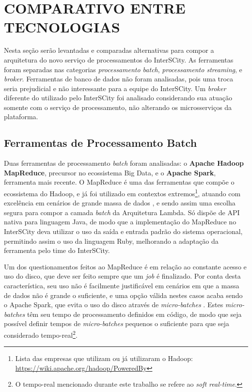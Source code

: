 \section{COMPARATIVO ENTRE TECNOLOGIAS}

Nesta seção serão levantadas e comparadas alternativas para compor a
arquitetura do novo serviço de processamentos do InterSCity. As ferramentas
foram separadas nas categorias \textit{processamento batch},
\textit{processamento streaming}, e \textit{broker}. Ferramentas de banco de
dados não foram analisadas, pois uma troca seria prejudicial e não interessante
para a equipe do InterSCity. Um \textit{broker} diferente do utilizado pelo
InterSCity foi analisado considerando sua atuação somente com o serviço de
processamento, não alterando os microsserviços da plataforma.

\subsection{Ferramentas de Processamento Batch}

Duas ferramentas de processamento \textit{batch} foram analisadas: o
\textbf{Apache Hadoop MapReduce}, precursor no ecossistema Big Data, e o
\textbf{Apache Spark}, ferramenta mais recente. O MapReduce é uma das
ferramentas que compõe o ecossistema do Hadoop, e já foi utilizado em contextos
extremos\footnote{Lista das empresas que utilizam ou já
utilizaram o Hadoop: \url{https://wiki.apache.org/hadoop/PoweredBy}}, atuando
com excelência em cenários de grande massa de dados \cite{zaharia2008}, e sendo
assim uma escolha segura para compor a camada \textit{batch} da Arquitetura
Lambda. Só dispõe de API nativa para linguagem Java, de modo que a
implementação do MapReduce no InterSCity deva utilizar o uso da saída e entrada
padrão do sistema operacional, permitindo assim o uso da linguagem Ruby,
melhorando a adaptação da ferramenta pelo time do InterSCity.

Um dos questionamentos feitos ao MapReduce é em relação ao constante acesso e
uso do disco, que deve ser feito sempre que um \textit{job} é finalizado. Por
conta desta característica, seu uso não é facilmente justificável em cenários em
que a massa de dados não é grande o suficiente, e uma opção válida nestes casos
acaba sendo o Apache Spark, que evita o uso do disco através de
\textit{micro-batches} \cite{arsalan2014}. Estes \textit{micro-batches} têm seu
tempo de processamento definidos em código, de modo que seja possível definir
tempos de \textit{micro-batches} pequenos o suficiente para que seja considerado
tempo-real\footnote{O tempo-real mencionado durante este trabalho se refere ao
\textit{soft real-time}.}.


